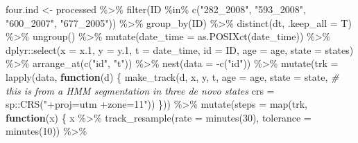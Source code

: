 \documentclass[
]{article}
\newenvironment{Shaded}{\begin{snugshade}}{\end{snugshade}}
\newcommand{\AttributeTok}[1]{\textcolor[rgb]{0.77,0.63,0.00}{#1}}
\newcommand{\CommentTok}[1]{\textcolor[rgb]{0.56,0.35,0.01}{\textit{#1}}}
\newcommand{\ControlFlowTok}[1]{\textcolor[rgb]{0.13,0.29,0.53}{\textbf{#1}}}
\newcommand{\DecValTok}[1]{\textcolor[rgb]{0.00,0.00,0.81}{#1}}
\newcommand{\FloatTok}[1]{\textcolor[rgb]{0.00,0.00,0.81}{#1}}
\newcommand{\FunctionTok}[1]{\textcolor[rgb]{0.00,0.00,0.00}{#1}}
\newcommand{\NormalTok}[1]{#1}
\newcommand{\OtherTok}[1]{\textcolor[rgb]{0.56,0.35,0.01}{#1}}
\newcommand{\SpecialCharTok}[1]{\textcolor[rgb]{0.00,0.00,0.00}{#1}}
\newcommand{\StringTok}[1]{\textcolor[rgb]{0.31,0.60,0.02}{#1}}
\begin{document}
\begin{Shaded}
\begin{Highlighting}[]
\NormalTok{four.ind }\OtherTok{\textless{}{-}}\NormalTok{ processed }\SpecialCharTok{\%\textgreater{}\%} 
  \FunctionTok{filter}\NormalTok{(ID }\SpecialCharTok{\%in\%} \FunctionTok{c}\NormalTok{(}\StringTok{"282\_2008"}\NormalTok{, }\StringTok{"593\_2008"}\NormalTok{, }\StringTok{"600\_2007"}\NormalTok{, }\StringTok{"677\_2005"}\NormalTok{)) }\SpecialCharTok{\%\textgreater{}\%} 
  \FunctionTok{group\_by}\NormalTok{(ID) }\SpecialCharTok{\%\textgreater{}\%} 
  \FunctionTok{distinct}\NormalTok{(dt, }\AttributeTok{.keep\_all =}\NormalTok{ T) }\SpecialCharTok{\%\textgreater{}\%}
  \FunctionTok{ungroup}\NormalTok{() }\SpecialCharTok{\%\textgreater{}\%} 
  \FunctionTok{mutate}\NormalTok{(}\AttributeTok{date\_time =} \FunctionTok{as.POSIXct}\NormalTok{(date\_time)) }\SpecialCharTok{\%\textgreater{}\%} 
\NormalTok{  dplyr}\SpecialCharTok{::}\FunctionTok{select}\NormalTok{(}\AttributeTok{x =}\NormalTok{ x}\FloatTok{.1}\NormalTok{, }\AttributeTok{y =}\NormalTok{ y}\FloatTok{.1}\NormalTok{, }
         \AttributeTok{t =}\NormalTok{ date\_time, }\AttributeTok{id =}\NormalTok{ ID, }\AttributeTok{age =}\NormalTok{ age, }\AttributeTok{state =}\NormalTok{ states) }\SpecialCharTok{\%\textgreater{}\%} 
  \FunctionTok{arrange\_at}\NormalTok{(}\FunctionTok{c}\NormalTok{(}\StringTok{"id"}\NormalTok{, }\StringTok{"t"}\NormalTok{)) }\SpecialCharTok{\%\textgreater{}\%} 
  \FunctionTok{nest}\NormalTok{(}\AttributeTok{data =} \SpecialCharTok{{-}}\FunctionTok{c}\NormalTok{(}\StringTok{"id"}\NormalTok{)) }\SpecialCharTok{\%\textgreater{}\%} 
  \FunctionTok{mutate}\NormalTok{(}\AttributeTok{trk =} \FunctionTok{lapply}\NormalTok{(data,}
                      \ControlFlowTok{function}\NormalTok{(d) \{}
                        \FunctionTok{make\_track}\NormalTok{(d, x, y, t, }
                                   \AttributeTok{age =}\NormalTok{ age, }
                                   \AttributeTok{state =}\NormalTok{ state, }\CommentTok{\# this is from a HMM segmentation in three de novo states}
                                   \AttributeTok{crs =}\NormalTok{ sp}\SpecialCharTok{::}\FunctionTok{CRS}\NormalTok{(}\StringTok{"+proj=utm +zone=11"}\NormalTok{))}
\NormalTok{                        \})) }\SpecialCharTok{\%\textgreater{}\%} 
  \FunctionTok{mutate}\NormalTok{(}\AttributeTok{steps =} \FunctionTok{map}\NormalTok{(trk, }\ControlFlowTok{function}\NormalTok{(x) \{}
\NormalTok{    x }\SpecialCharTok{\%\textgreater{}\%}
      \FunctionTok{track\_resample}\NormalTok{(}\AttributeTok{rate =} \FunctionTok{minutes}\NormalTok{(}\DecValTok{30}\NormalTok{), }\AttributeTok{tolerance =} \FunctionTok{minutes}\NormalTok{(}\DecValTok{10}\NormalTok{)) }\SpecialCharTok{\%\textgreater{}\%}

\end{Highlighting}
\end{Shaded}
\end{document}
